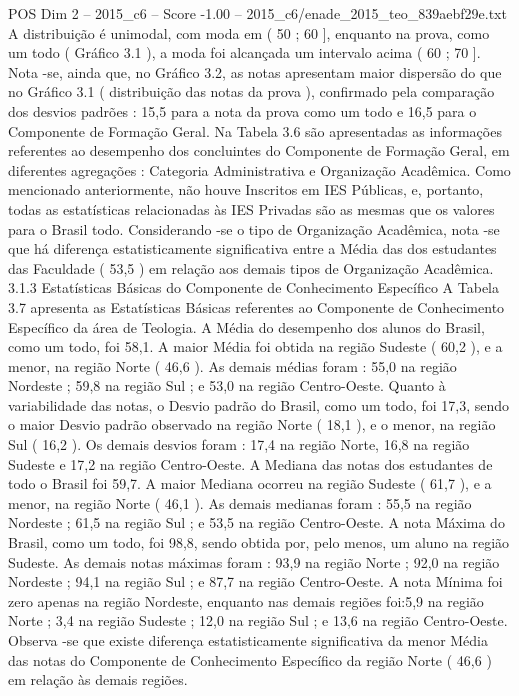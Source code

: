 \begin{textsample}{POS Dim 2 – 2015\_c6 – Score -1.00 – 2015\_c6/enade\_2015\_teo\_839aebf29e.txt}
A distribuição é unimodal, com moda em ( 50 ; 60 ], enquanto na prova, como um todo ( Gráfico 3.1 ), a moda foi alcançada um intervalo acima ( 60 ; 70 ].
Nota -se, ainda que, no Gráfico 3.2, as notas apresentam maior dispersão do que no Gráfico 3.1 ( distribuição das notas da prova ), confirmado pela comparação dos desvios padrões : 15,5 para a nota da prova como um todo e 16,5 para o Componente de Formação Geral.
Na Tabela 3.6 são apresentadas as informações referentes ao desempenho dos concluintes do Componente de Formação Geral, em diferentes agregações : Categoria Administrativa e Organização Acadêmica.
Como mencionado anteriormente, não houve Inscritos em IES Públicas, e, portanto, todas as estatísticas relacionadas às IES Privadas são as mesmas que os valores para o Brasil todo.
Considerando -se o tipo de Organização Acadêmica, nota -se que há diferença estatisticamente significativa entre a Média das dos estudantes das Faculdade ( 53,5 ) em relação aos demais tipos de Organização Acadêmica. 3.1.3 Estatísticas Básicas do Componente de Conhecimento Específico A Tabela 3.7 apresenta as Estatísticas Básicas referentes ao Componente de Conhecimento Específico da área de Teologia.
A Média do desempenho dos alunos do Brasil, como um todo, foi 58,1.
A maior Média foi obtida na região Sudeste ( 60,2 ), e a menor, na região Norte ( 46,6 ).
As demais médias foram : 55,0 na região Nordeste ; 59,8 na região Sul ; e 53,0 na região Centro-Oeste.
Quanto à variabilidade das notas, o Desvio padrão do Brasil, como um todo, foi 17,3, sendo o maior Desvio padrão observado na região Norte ( 18,1 ), e o menor, na região Sul ( 16,2 ).
Os demais desvios foram : 17,4 na região Norte, 16,8 na região Sudeste e 17,2 na região Centro-Oeste.
A Mediana das notas dos estudantes de todo o Brasil foi 59,7.
A maior Mediana ocorreu na região Sudeste ( 61,7 ), e a menor, na região Norte ( 46,1 ).
As demais medianas foram : 55,5 na região Nordeste ; 61,5 na região Sul ; e 53,5 na região Centro-Oeste.
A nota Máxima do Brasil, como um todo, foi 98,8, sendo obtida por, pelo menos, um aluno na região Sudeste.
As demais notas máximas foram : 93,9 na região Norte ; 92,0 na região Nordeste ; 94,1 na região Sul ; e 87,7 na região Centro-Oeste.
A nota Mínima foi zero apenas na região Nordeste, enquanto nas demais regiões foi:5,9 na região Norte ; 3,4 na região Sudeste ; 12,0 na região Sul ; e 13,6 na região Centro-Oeste.
Observa -se que existe diferença estatisticamente significativa da menor Média das notas do Componente de Conhecimento Específico da região Norte ( 46,6 ) em relação às demais regiões.

\end{textsample}
